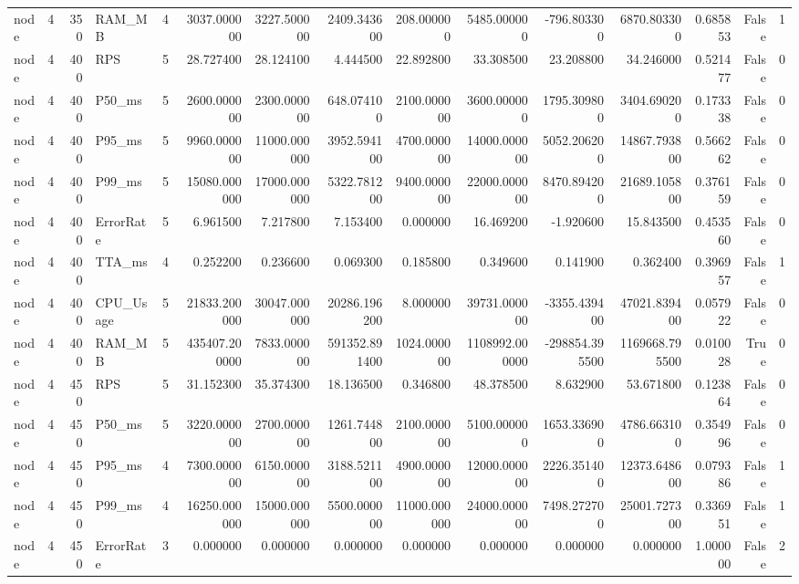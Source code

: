 \begin{tabular}{lrrlrrrrrrrrrrr}
node & 4 & 350 & RAM_MB & 4 & 3037.000000 & 3227.500000 & 2409.343600 & 208.000000 & 5485.000000 & -796.803300 & 6870.803300 & 0.685853 & False & 1 \\
node & 4 & 400 & RPS & 5 & 28.727400 & 28.124100 & 4.444500 & 22.892800 & 33.308500 & 23.208800 & 34.246000 & 0.521477 & False & 0 \\
node & 4 & 400 & P50_ms & 5 & 2600.000000 & 2300.000000 & 648.074100 & 2100.000000 & 3600.000000 & 1795.309800 & 3404.690200 & 0.173338 & False & 0 \\
node & 4 & 400 & P95_ms & 5 & 9960.000000 & 11000.000000 & 3952.594100 & 4700.000000 & 14000.000000 & 5052.206200 & 14867.793800 & 0.566262 & False & 0 \\
node & 4 & 400 & P99_ms & 5 & 15080.000000 & 17000.000000 & 5322.781200 & 9400.000000 & 22000.000000 & 8470.894200 & 21689.105800 & 0.376159 & False & 0 \\
node & 4 & 400 & ErrorRate & 5 & 6.961500 & 7.217800 & 7.153400 & 0.000000 & 16.469200 & -1.920600 & 15.843500 & 0.453560 & False & 0 \\
node & 4 & 400 & TTA_ms & 4 & 0.252200 & 0.236600 & 0.069300 & 0.185800 & 0.349600 & 0.141900 & 0.362400 & 0.396957 & False & 1 \\
node & 4 & 400 & CPU_Usage & 5 & 21833.200000 & 30047.000000 & 20286.196200 & 8.000000 & 39731.000000 & -3355.439400 & 47021.839400 & 0.057922 & False & 0 \\
node & 4 & 400 & RAM_MB & 5 & 435407.200000 & 7833.000000 & 591352.891400 & 1024.000000 & 1108992.000000 & -298854.395500 & 1169668.795500 & 0.010028 & True & 0 \\
node & 4 & 450 & RPS & 5 & 31.152300 & 35.374300 & 18.136500 & 0.346800 & 48.378500 & 8.632900 & 53.671800 & 0.123864 & False & 0 \\
node & 4 & 450 & P50_ms & 5 & 3220.000000 & 2700.000000 & 1261.744800 & 2100.000000 & 5100.000000 & 1653.336900 & 4786.663100 & 0.354996 & False & 0 \\
node & 4 & 450 & P95_ms & 4 & 7300.000000 & 6150.000000 & 3188.521100 & 4900.000000 & 12000.000000 & 2226.351400 & 12373.648600 & 0.079386 & False & 1 \\
node & 4 & 450 & P99_ms & 4 & 16250.000000 & 15000.000000 & 5500.000000 & 11000.000000 & 24000.000000 & 7498.272700 & 25001.727300 & 0.336951 & False & 1 \\
node & 4 & 450 & ErrorRate & 3 & 0.000000 & 0.000000 & 0.000000 & 0.000000 & 0.000000 & 0.000000 & 0.000000 & 1.000000 & False & 2 \\

\end{tabular}

